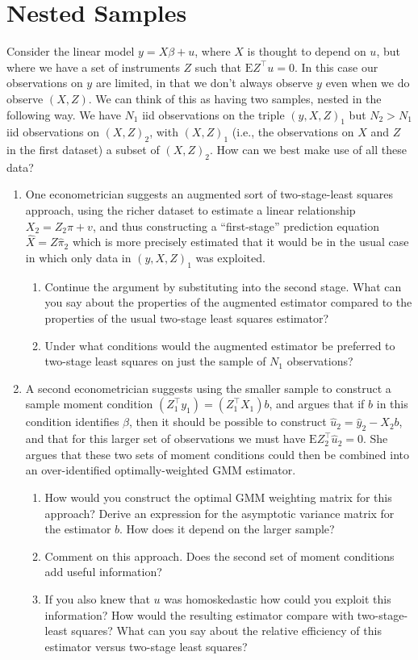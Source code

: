 \documentclass[12pt]{amsart}
\newcommand{\T}{\top}
\newcommand{\E}{\ensuremath{\mbox{E}}}
\begin{document}
\section{Nested Samples}
\label{sec:org973deea}
Consider the linear model \(y=X\beta + u\), where \(X\) is thought to
depend on \(u\), but where we have a set of instruments \(Z\) such that
\(\E Z^\T u = 0\).  In this case our observations on \(y\) are limited,
in that we don't always observe \(y\) even when we do observe
\((X,Z)\).  We can think of this as having two samples, nested in the
following way.  We have \(N_1\) iid observations on the triple
\((y,X,Z)_1\) but \(N_2>N_1\) iid observations on \((X,Z)_2\), with \((X,Z)_1\)
(i.e., the observations on \(X\) and \(Z\) in the first dataset) a
subset of \((X,Z)_2\).  How can we best make use of all these data?
\begin{enumerate}
\item One econometrician suggests an augmented sort of two-stage-least
squares approach, using the richer dataset to estimate a
linear relationship \(X_2 = Z_2\pi + v\), and thus constructing a
``first-stage'' prediction equation \(\hat{X} = Z\hat{\pi}_2\) which
is more precisely estimated that it would be in the usual case in
which only data in \((y,X,Z)_1\) was exploited.
\begin{enumerate}
\item Continue the argument by substituting into the second stage.
What can you say about the properties of the augmented
estimator compared to the properties of the usual
two-stage least squares estimator?
\item Under what conditions would the augmented estimator be
preferred to two-stage least squares on just the sample of
\(N_1\) observations?
\end{enumerate}

\item A second econometrician suggests using the smaller sample to
construct a sample moment condition \((Z_1^\T y_1)=(Z_1^\T X_1)b\),
and argues that if \(b\) in this condition identifies \(\beta\), then
it should be possible to construct \(\hat{u}_2 = \hat{y}_2 -
     X_2b\), and that for this larger set of observations we must have
\(\E Z_2^\T\hat{u}_2 = 0\).  She argues that these two sets of moment
conditions could then be combined into an over-identified
optimally-weighted GMM estimator.
\begin{enumerate}
\item How would you construct the optimal GMM weighting matrix for
this approach?  Derive an expression for the asymptotic
variance matrix for the estimator \(b\).  How does it depend on
the larger sample?
\item Comment on this approach.  Does the second set of moment
conditions add useful information?
\item If you also knew that \(u\) was homoskedastic how could you
exploit this information?  How would the resulting estimator
compare with two-stage-least squares?  What can you say about
the relative efficiency of this estimator versus two-stage
least squares?
\end{enumerate}
\end{enumerate}
\end{document}
